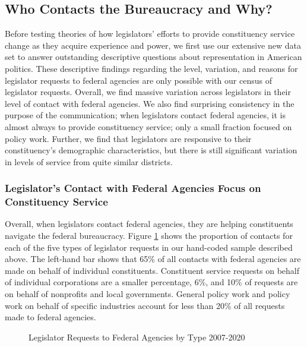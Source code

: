 \documentclass[12pt]{article}
\begin{document}
\subsection{Who Contacts the Bureaucracy and Why?} \label{s:descriptive} 
Before testing theories of how legislators' efforts to provide constituency service change as they acquire experience and power, we first use our extensive new data set to answer outstanding descriptive questions about representation in American politics. These descriptive findings regarding the level, variation, and reasons for legislator requests to federal agencies are only possible with our census of legislator requests. Overall, we find massive variation across legislators in their level of contact with federal agencies. We also find surprising consistency in the purpose of the communication; when legislators contact federal agencies, it is almost always to provide constituency service; only a small fraction focused on policy work. Further, we find that legislators are responsive to their constituency's demographic characteristics, but there is still significant variation in levels of service from quite similar districts.  

\subsubsection{Legislator's Contact with Federal Agencies Focus on Constituency Service}
Overall, when legislators contact federal agencies, they are helping constituents navigate the federal bureaucracy. Figure \ref{f:type2} shows the proportion of contacts for each of the five types of legislator requests in our hand-coded sample described above. 
The left-hand bar shows that 65\% of all contacts with federal agencies are made on behalf of individual constituents. Constituent service requests on behalf of individual corporations are a smaller percentage, 6\%, and 10\% of requests are on behalf of nonprofits and local governments. General policy work and policy work on behalf of specific industries account for less than 20\% of all requests made to federal agencies.  


\begin{figure}[hbt!]
\centering
\caption{Legislator Requests to Federal Agencies by Type 2007-2020} \label{f:type2}
\end{figure}
\end{document}
